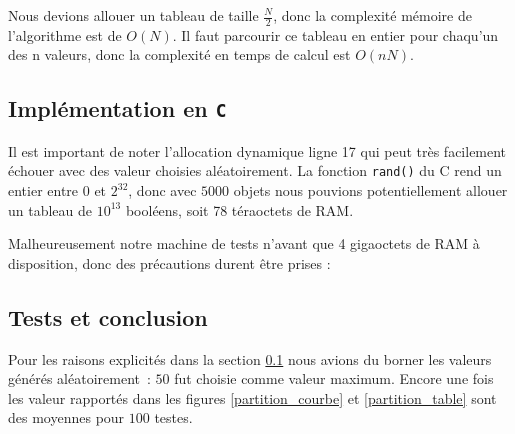 Nous devions allouer un tableau de taille $\frac{N}{2}$, donc la complexité mémoire de l'algorithme est de $O(N).$ Il faut parcourir ce tableau en entier pour chaqu'un des n valeurs, donc la complexité en temps de calcul est $O(nN)$. 


\subsection{Implémentation en \texttt{C}}
\label{implementation_c}
Il est important de noter l'allocation dynamique ligne 17 qui peut très facilement échouer avec des valeur choisies aléatoirement. La fonction \texttt{rand()} du C rend un entier entre $0$ et $2^{32}$, donc avec $5000$ objets nous pouvions potentiellement allouer un tableau de $10^{13}$ booléens, soit 78 téraoctets de RAM.

Malheureusement notre machine de tests n'avant que 4 gigaoctets de RAM à disposition, donc des précautions durent être prises :

\vspace{0.5cm}

 

\subsection{Tests et conclusion}

Pour les raisons explicités dans la section \ref{implementation_c} nous avions du borner les valeurs générés aléatoirement~: $50$ fut choisie comme valeur maximum. Encore une fois les valeur rapportés dans les figures \ref{partition_courbe} et \ref{partition_table} sont des moyennes pour $100$ testes.

